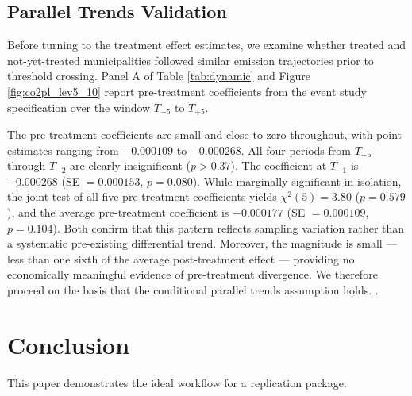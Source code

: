 \documentclass[12pt]{article}
\begin{document}
\subsection{Parallel Trends Validation}
\label{sec:pretrends}
Before turning to the treatment effect estimates, we examine whether 
treated and not-yet-treated municipalities followed similar emission 
trajectories prior to threshold crossing. Panel A of Table 
\ref{tab:dynamic} and Figure \ref{fig:co2pl_lev5_10} report pre-treatment 
coefficients from the event study specification over the window 
$T_{-5}$ to $T_{+5}$.

The pre-treatment coefficients are small and close to zero throughout, 
with point estimates ranging from $-0.000109$ to $-0.000268$. All 
four periods from $T_{-5}$ through $T_{-2}$ are clearly insignificant 
($p > 0.37$). The coefficient at $T_{-1}$ is $-0.000268$ 
(SE $= 0.000153$, $p = 0.080$). While marginally 
significant in isolation, the joint test of all five pre-treatment coefficients  yields $\chi^2(5) = 3.80$ ($p = 0.579$), and the 
average pre-treatment coefficient is $-0.000177$ 
(SE $= 0.000109$, $p = 0.104$). Both confirm that 
this pattern reflects sampling variation rather than a systematic 
pre-existing differential trend. Moreover, the 
magnitude is small --- less than one sixth of the 
average post-treatment effect --- providing no 
economically meaningful evidence of pre-treatment 
divergence. We therefore proceed on the basis that 
the conditional parallel trends assumption holds.
\label{highlightedResultInPaperPage}
.

\section{Conclusion}
\label{sec:conclusion}

This paper demonstrates the ideal workflow for a replication package.

\end{document}
